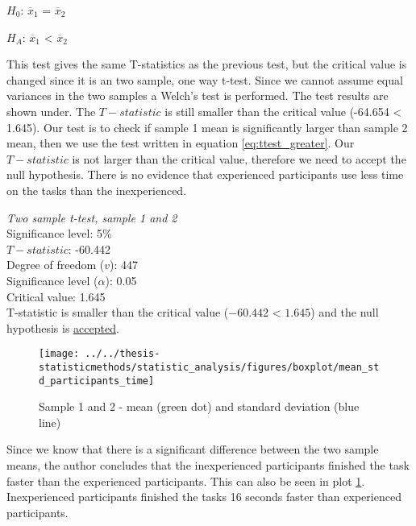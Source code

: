 \centerline{$H_{0}$: $\overline{x}_1$ = $\overline{x}_2$}
\centerline{$H_{A}$: $\overline{x}_1$ < $\overline{x}_2$}

This test gives the same T-statistics as the previous test, but the critical value is changed since it is an two sample, one way t-test. Since we cannot assume equal variances in the two samples a Welch's test is performed. The test results are shown under. The $T-statistic$ is still smaller than the critical value (-64.654 < 1.645). Our test is to check if sample 1 mean is significantly larger than sample 2 mean, then we use the test written in equation \ref{eq:ttest_greater}. Our $T-statistic$ is not larger than the critical value, therefore we need to accept the null hypothesis. There is no evidence that experienced participants use less time on the tasks than the inexperienced. 

 \begin{center}
	\begin{tcolorbox}[box align=center,width=\textwidth-5cm]
		\centering
		\textit{Two sample t-test, sample 1 and 2}\\
		Significance level: 5\%  \\[0.5cm]
		
		$T-statistic$: -60.442 \\
		Degree of freedom ($v$): 447 \\ %
		Significance level ($\alpha$): 0.05 \\
		Critical value: 1.645\\[0.2cm]
		
		T-statistic is smaller than the critical value ($-60.442$ < $1.645$) and the null hypothesis is \underline{accepted}.\\[0.5cm]
	\end{tcolorbox} 
\end{center}

\begin{figure}[H]
	\centering
	\texttt{[image: ../../thesis-statisticmethods/statistic\_analysis/figures/boxplot/mean\_std\_participants\_time]}
	\caption{Sample 1 and 2 - mean (green dot) and standard deviation (blue line)}
	\label{fig:meanstdparticipantstime}
\end{figure}

Since we know that there is a significant difference between the two sample means, the author concludes that the inexperienced participants finished the task faster than the experienced participants. This can also be seen in plot \ref{fig:meanstdparticipantstime}. Inexperienced participants finished the tasks 16 seconds faster than experienced participants. \newline

